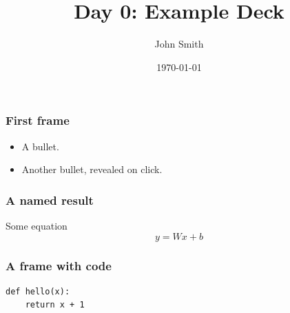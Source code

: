 %
\providecommand{\HANDOUT}{1}




\title[Day 0: Example Deck]
{Day 0: Example Deck}

\author[John Smith]
{John Smith}


\date[\today]
{\today}

\frame{\titlepage}

\begin{frame}
\frametitle{First frame}
\begin{itemize}
    \item A bullet.
    \pause
    \item Another bullet, revealed on click.
\end{itemize}
\end{frame}

\begin{frame}
\frametitle{A named result}
\begin{block}{Some equation}
    $$ y = Wx + b $$
\end{block}
\end{frame}

\begin{frame}[fragile]
\frametitle{A frame with code}
\begin{block}{}
\begin{lstlisting}
def hello(x):
    return x + 1
\end{lstlisting}
\end{block}
\end{frame}

